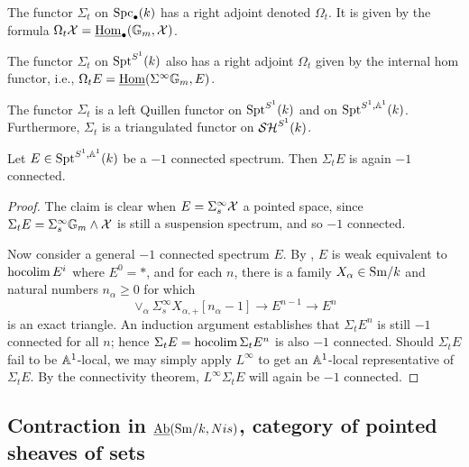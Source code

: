 \documentclass{amsart}%
\begin{document}
\begin{definition}
  The functor $\Sigma_t$ on $\mathrm{Spc}_{\bullet}(k)$ has a right adjoint
  denoted $\Omega_t$. It is given by the formula
  $\Omega_t\mathcal{X} = \underline{\operatorname{Hom}}_{\bullet}(\mathbb{G}_m,\mathcal{X})$.

  The functor $\Sigma_t$ on $\mathrm{Spt}^{S^1}(k)$ also has a right adjoint
  $\Omega_t$ given by the internal hom functor, i.e.,
  $\Omega_tE = \underline{\operatorname{Hom}}(\Sigma^{\infty}\mathbb{G}_{m}, E)$.
\end{definition}

\begin{proposition}
  The functor $\Sigma_t$ is a left Quillen functor on $\mathrm{Spt}^{S^1}(k)$
  and on $\mathrm{Spt}^{S^1,\mathbb{A}^1}(k)$. Furthermore, $\Sigma_t$ is a
  triangulated functor on $\mathcal{SH}^{S^1}(k)$.
\end{proposition}

\begin{lemma}
  Let $E \in \mathrm{Spt}^{S^1,\mathbb{A}^1}(k)$ be a $-1$ connected spectrum. Then
  $\Sigma_t E$ is again $-1$ connected.
\end{lemma}

\begin{proof}
  The claim is clear when $E = \Sigma^{\infty}_s \mathcal{X}$ a pointed
  space, since $\Sigma_t E = \Sigma^{\infty}_s \mathbb{G}_m \wedge \mathcal{X}$ is
  still a suspension spectrum, and so $-1$ connected.

  Now consider a general $-1$ connected spectrum $E$. By \cite[Lemma
  3.3.4]{Mor05}, $E$ is weak equivalent to $ \operatorname{hocolim} E^i$ where
  $E^0 = *$, and for each $n$, there is a family
  $X_{\alpha} \in \mathrm{Sm}/k$ and natural numbers $n_{\alpha}\geq 0$ for
  which
  \begin{equation*}
    \vee_{\alpha}\Sigma^{\infty}_s X_{\alpha,+}[n_{\alpha}-1] \to E^{n-1} \to E^{n}
  \end{equation*}
  is an exact triangle. An induction argument establishes that
  $\Sigma_t E^{n}$ is still $-1$ connected for all $n$; hence
  $\Sigma_t E =\operatorname{hocolim} \Sigma_t E^n$ is also $-1$ connected. Should
  $\Sigma_t E$ fail to be $\mathbb{A}^1$-local, we may simply apply
  $L^{\infty}$ to get an $\mathbb{A}^1$-local representative of
  $\Sigma_t E$. By the connectivity theorem, $L^{\infty}\Sigma_t E$
  will again be $-1$ connected. 
\end{proof}

\subsection{Contraction in $\operatorname{\underline{Ab}}(\mathrm{Sm}/k,Nis)$, category of pointed
  sheaves of sets}
\end{document}
